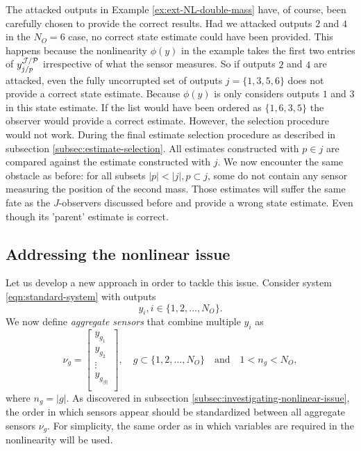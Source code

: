 The attacked outputs in Example \ref{ex:ext-NL-double-mass} have, of course, been carefully chosen to provide the correct results. Had we attacked outputs $2$ and $4$ in the $N_O=6$ case, no correct state estimate could have been provided. This happens because the nonlinearity $\phi(y)$ in the example takes the first two entries of $y^{\mathcal{J}/\mathcal{P}}_{j/p}$ irrespective of what the sensor measures. So if outputs $2$ and $4$ are attacked, even the fully uncorrupted set of outputs $j=\{1,3,5,6\}$ does not provide a correct state estimate. Because $\phi(y)$ is only considers outputs $1$ and $3$ in this state estimate. If the list would have been ordered as $\{1,6,3,5\}$ the observer would provide a correct estimate. However, the selection procedure would not work. During the final estimate selection procedure as described in subsection \ref{subsec:estimate-selection}. All estimates constructed with $p \in j$ are compared against the estimate constructed with $j$. We now encounter the same obstacle as before: for all subsets $|p| < |j|, p \subset j$, some do not contain any sensor measuring the position of the second mass. Those estimates will suffer the same fate as the $J$-observers discussed before and provide a wrong state estimate. Even though its 'parent' estimate is correct.

\subsection{Addressing the nonlinear issue}
Let us develop a new approach in order to tackle this issue. Consider system \eqref{eqn:standard-system} with outputs
\begin{equation*}
    y_i, i \in \{1,2,\dots,N_O\}.
\end{equation*}
We now define \textit{aggregate sensors} that combine multiple $y_i$ as
\begin{equation}
    \nu_g = 
    \begin{bmatrix}
        y_{g_1} \\ y_{g_2} \\ \vdots \\ y_{g_{|g|}} \\
    \end{bmatrix}
    , \quad g \subset \{1,2,\dots,N_O\} \quad \text{and} \quad 1 < n_g < N_O,
\end{equation}
where $n_g=|g|$. As discovered in subsection \ref{subsec:investigating-nonlinear-issue}, the order in which sensors appear should be standardized between all aggregate sensors $\nu_g$. For simplicity, the same order as in which variables are required in the nonlinearity will be used.

